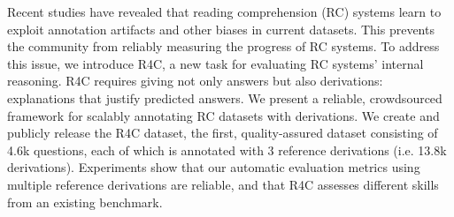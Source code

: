Recent studies have revealed that reading comprehension (RC) systems learn to exploit annotation artifacts and other biases in current datasets. This prevents the community from reliably measuring the progress of RC systems. To address this issue, we introduce R4C, a new task for evaluating RC systems' internal reasoning. R4C requires giving not only answers but also derivations: explanations that justify predicted answers. We present a reliable, crowdsourced framework for scalably annotating RC datasets with derivations. We create and publicly release the R4C dataset, the first, quality-assured dataset consisting of 4.6k questions, each of which is annotated with 3 reference derivations (i.e. 13.8k derivations). Experiments show that our automatic evaluation metrics using multiple reference derivations are reliable, and that R4C assesses different skills from an existing benchmark.
